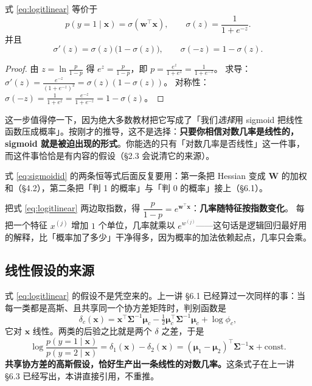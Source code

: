 \documentclass[11pt,a4paper,fontset=windows,zihao=-4]{ctexart}
\newcommand{\bw}{\mathbf{w}}
\newcommand{\bx}{\mathbf{x}}
\newcommand{\bW}{\mathbf{W}}
\newcommand{\bSigma}{\boldsymbol{\Sigma}}
\newcommand{\bmu}{\boldsymbol{\mu}}
\newcommand{\tp}{^{\top}}
\begin{document}
\begin{prop}
式 \eqref{eq:logitlinear} 等价于
\begin{equation}
  p(y=1\mid\bx)=\sigma(\bw\tp\bx),\qquad
  \sigma(z)=\frac{1}{1+e^{-z}} .
  \label{eq:sigmoid}
\end{equation}
并且
\begin{equation}
  \sigma'(z)=\sigma(z)\bigl(1-\sigma(z)\bigr),\qquad
  \sigma(-z)=1-\sigma(z).
  \label{eq:sigmoidid}
\end{equation}
\end{prop}

\begin{proof}
由 $z=\ln\frac{p}{1-p}$ 得 $e^{z}=\frac{p}{1-p}$，即 $p=\frac{e^{z}}{1+e^{z}}=\frac{1}{1+e^{-z}}$。
求导：$\sigma'(z)=\frac{e^{-z}}{(1+e^{-z})^{2}}=\sigma(z)(1-\sigma(z))$。
对称性：$\sigma(-z)=\frac{1}{1+e^{z}}=\frac{e^{-z}}{1+e^{-z}}=1-\sigma(z)$。
\end{proof}

这一步值得停一下，因为绝大多数教材把它写成了「我们\emph{选择}用 sigmoid 把线性函数压成概率」。按刚才的推导，这不是选择：\textbf{只要你相信对数几率是线性的，sigmoid 就是被迫出现的形式}。你能选的只有「对数几率是否线性」这一件事，而这件事恰恰是有内容的假设（\S2.3 会说清它的来源）。

式 \eqref{eq:sigmoidid} 的两条恒等式后面反复要用：第一条把 Hessian 变成 $\bW$ 的加权和（\S4.2），第二条把「判 1 的概率」与「判 0 的概率」接上（\S6.1）。

\begin{add}
把式 \eqref{eq:logitlinear} 两边取指数，得 $\dfrac{p}{1-p}=e^{\bw\tp\bx}$：\textbf{几率随特征按指数变化}。
每把一个特征 $x^{(j)}$ 增加 $1$ 个单位，几率就乘以 $e^{w^{(j)}}$——这句话是逻辑回归最好用的解释，比「概率加了多少」干净得多，因为概率的加法依赖起点，几率只会乘。
\end{add}
\subsection{线性假设的来源}

式 \eqref{eq:logitlinear} 的假设不是凭空来的。上一讲 §6.1 已经算过一次同样的事：当每一类都是高斯、且共享同一个协方差矩阵时，判别函数是
\begin{equation}
  \delta_c(\bx)=\bx\tp\bSigma^{-1}\bmu_c-\tfrac12\bmu_c\tp\bSigma^{-1}\bmu_c+\log\phi_c ,
  \label{eq:deltac}
\end{equation}
它对 $\bx$ 线性。两类的后验之比就是两个 $\delta$ 之差，于是
\begin{equation}
  \log\frac{p(y=1\mid\bx)}{p(y=2\mid\bx)}
  =\delta_1(\bx)-\delta_2(\bx)
  =(\bmu_1-\bmu_2)\tp\bSigma^{-1}\bx+\text{const}.
  \label{eq:gdaLogit}
\end{equation}
\textbf{共享协方差的高斯假设，恰好生产出一条线性的对数几率。}这条式子在上一讲 §6.3 已经写出，本讲直接引用，不重推。
\end{document}
